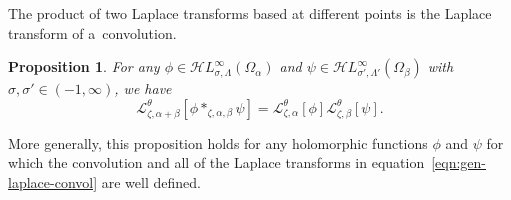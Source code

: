 \documentclass[pdftex]{sigma}
\newcommand{\singexp}[2]{\mathcal{H}L^\infty_{#1, #2}}
\newcommand{\laplace}{\mathcal{L}}
\numberwithin{equation}{section}
\newtheorem{Proposition}[Theorem]{Proposition}
 { \theoremstyle{definition}
\newtheorem{Definition}[Theorem]{Definition}
\newtheorem{Remark}[Theorem]{Remark}
\newtheorem*{notation*}{Notation}
}
\begin{document}
The product of two Laplace transforms based at different points is the Laplace transform of a~convolution.
\begin{Proposition}
For any $\phi\in\singexp{\sigma}{\Lambda}(\Omega_\alpha)$ and $\psi\in\singexp{\sigma'}{\Lambda'}(\Omega_\beta)$ with $\sigma,\sigma'\in (-1,\infty)$, we have
\begin{equation}\label{eqn:gen-laplace-convol}
\laplace^\theta_{\zeta,\alpha+\beta}[\phi \ast_{\zeta,\alpha,\beta} \psi] = \laplace^\theta_{\zeta,\alpha}[\phi] \laplace^\theta_{\zeta,\beta}[\psi].
\end{equation}
\end{Proposition}
More generally, this proposition holds for any holomorphic functions $\phi$ and $\psi$ for which the convolution and all of the Laplace transforms in equation~\eqref{eqn:gen-laplace-convol} are well defined.
\end{document}
